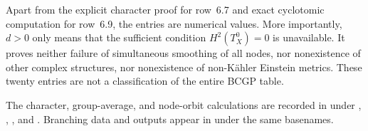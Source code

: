 \documentclass[a4paper,11pt]{article}
\numberwithin{equation}{section}
\theoremstyle{definition}
\begin{document}
Apart from the explicit character proof for row~6.7 and exact cyclotomic computation for row~6.9, the entries are numerical values. More importantly, $d>0$ only means that the sufficient condition $H^2(T_X^0)=0$ is unavailable. It proves neither failure of simultaneous smoothing of all nodes, nor nonexistence of other complex structures, nor nonexistence of non-K\"ahler Einstein metrics. These twenty entries are not a classification of the entire BCGP table.


The character, group-average, and node-orbit calculations are recorded in
 under
,
,
, and
. Branching data and outputs appear in
 under the same basenames.
\end{document}
